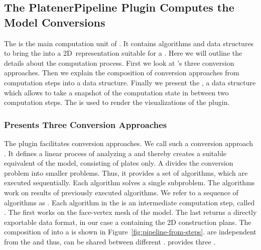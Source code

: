 \documentclass[../../ClassicThesis.tex]{subfiles}
\begin{document}
\subsection{The PlatenerPipeline Plugin Computes the Model
  Conversions}
\label{sec:platener-pipeline-plugin}


The  is the main computation unit of
{\platener}. It contains algorithms and data structures to
bring the {\threedmodel} into a 2D~representation suitable
for a {\lasercutter}. Here we will outline the details about
the computation process. First we look at {\platener}'s
three conversion approaches. Then we explain the
composition of conversion approaches from computation steps
into a  data structure. Finally we present
the , a data structure which allows to
take a snapshot of the computation state in between two
computation steps. The  is used to
render the visualizations of the 
plugin.


\subsubsection{{\platener} Presents Three Conversion
  Approaches}

The  plugin facilitates conversion
approaches. We call such a conversion approach
\class{\fabmethod}.
It defines a linear process of analyzing a {\threedmodel}
and thereby creates a suitable equivalent of the model,
consisting of plates only. A \class{\fabmethod}
divides the conversion problem into smaller problems. Thus,
it provides a set of algorithms, which are executed
sequentially. Each algorithm solves a single subproblem. The
algorithms work on results of previously executed
algorithms. We refer to a sequence of algorithms as
. Each algorithm in the  is
an intermediate computation step, called
. The first  works
on the face-vertex mesh of the model. The last
 returns a directly exportable data
format, in our case a {\zipfile} containing the
2D construction plans. The composition of
 into a  is shown in
Figure~\ref{fig:pipeline-from-steps}. 
are independent from the \class{\fabmethod} and thus, can be
shared between different . {\platener}
provides three .
\end{document}
